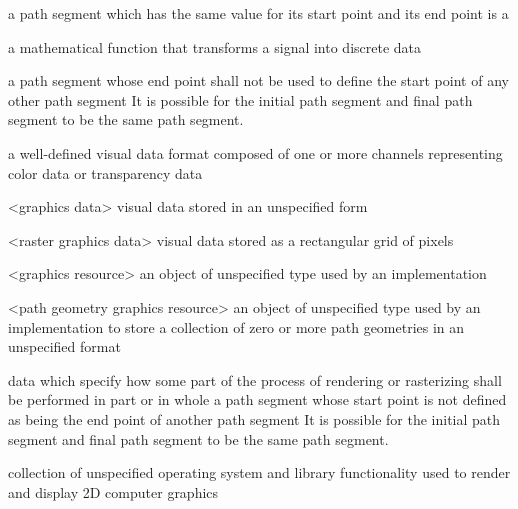 a path segment which has the same value for its start point and its end point is a 

a mathematical function that transforms a signal into discrete data

a path segment whose end point shall not be used to define the start point of any other path segment
\enternote
It is possible for the initial path segment and final path segment to be the same path segment.
\exitnote

a well-defined visual data format composed of one or more channels representing 
color data or transparency data

<graphics data> visual data stored in an unspecified form

<raster graphics data> visual data stored as a rectangular grid of pixels

<graphics resource> an object of unspecified type used by an implementation

<path geometry graphics resource> an object of unspecified type used by an implementation to store a collection of zero or more path geometries in an unspecified format

data which specify how some part of the process of rendering or rasterizing shall be performed in part or in whole
a path segment whose start point is not defined as being the end point of another path segment
\enternote
It is possible for the initial path segment and final path segment to be the same path segment.
\exitnote

collection of unspecified operating system and library functionality used to render and display 2D computer graphics

